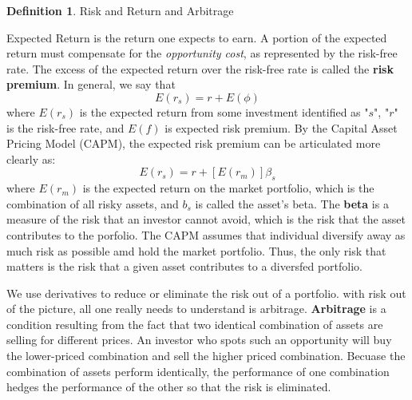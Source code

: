 \documentclass{book}
\theoremstyle{definition}
\newtheorem{definition}{Definition}[section]
\theoremstyle{remark}
\begin{document}
        
        \begin{definition}{Risk and Return and Arbitrage}
            
            Expected Return is the return one expects to earn. A portion of the expected return must compensate for the \textit{opportunity cost}, as represented by the risk-free rate. The excess of the expected return over the risk-free rate is called the \textbf{risk premium}. In general, we say that 
                \begin{equation}
                    E(r_s)= r + E(\phi)
                \end{equation}
            where $E(r_s)$ is the expected return from some investment identified as "$s$", "$r$" is the risk-free rate, and $E(f)$ is expected risk premium. By the Capital Asset Pricing Model (CAPM), the expected risk premium can be articulated more clearly as: 
                \begin{equation}
                    E(r_s) = r + [E(r_m)]\beta_s
                \end{equation}
            where $E(r_m)$ is the expected return on the market portfolio, which is the combination of all risky assets, and $b_s$ is called the asset's beta. The \textbf{beta} is a measure of the risk that an investor cannot avoid, which is the risk that the asset contributes to the porfolio. The CAPM assumes that individual diversify away as much risk as possible amd hold the market portfolio. Thus, the only risk that matters is the risk that a given asset contributes to a diversfed portfolio.
            
            We use derivatives to reduce or eliminate the risk out of a portfolio. with risk out of the picture, all one really needs to understand is arbitrage. \textbf{Arbitrage} is a condition resulting from the fact that two identical combination of assets are selling for different prices. An investor who spots such an opportunity will buy the lower-priced combination and sell the higher priced combination. Becuase the combination of assets perform identically, the performance of one combination hedges the performance of the other so that the risk is eliminated. 
        \end{definition}
    
    \newpage
\end{document}
